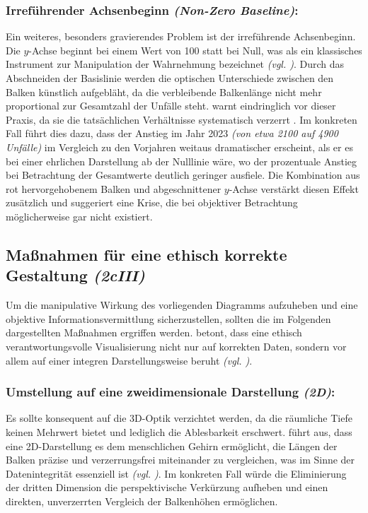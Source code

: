 \subsubsection{Irreführender Achsenbeginn \textit{(Non-Zero Baseline)}:}
Ein weiteres, besonders gravierendes Problem ist der irreführende Achsenbeginn. Die \(y\)-Achse beginnt bei einem Wert von 100 statt bei Null, was \citeauthor{1} als ein klassisches Instrument zur Manipulation der Wahrnehmung bezeichnet \textit{(\acs{vgl.} \cite[50]{1})}. Durch das Abschneiden der Basislinie werden die optischen Unterschiede zwischen den Balken künstlich aufgebläht, da die verbleibende Balkenlänge nicht mehr proportional zur Gesamtzahl der Unfälle steht. \citeauthor{2} warnt eindringlich vor dieser Praxis, da sie die tatsächlichen Verhältnisse systematisch verzerrt \cite[31, 55]{2}. Im konkreten Fall führt dies dazu, dass der Anstieg im Jahr 2023 \textit{(von etwa 2100 auf 4900 Unfälle)} im Vergleich zu den Vorjahren weitaus dramatischer erscheint, als er es bei einer ehrlichen Darstellung ab der Nulllinie wäre, wo der prozentuale Anstieg bei Betrachtung der Gesamtwerte deutlich geringer ausfiele. Die Kombination aus rot hervorgehobenem Balken und abgeschnittener \(y\)-Achse verstärkt diesen Effekt zusätzlich und suggeriert eine Krise, die bei objektiver Betrachtung möglicherweise gar nicht existiert.


\subsection{Maßnahmen für eine ethisch korrekte Gestaltung \textit{(2cIII)}}

Um die manipulative Wirkung des vorliegenden Diagramms aufzuheben und eine objektive Informationsvermittlung sicherzustellen, sollten die im Folgenden dargestellten Maßnahmen ergriffen werden. \citeauthor{2} betont, dass eine ethisch verantwortungsvolle Visualisierung nicht nur auf korrekten Daten, sondern vor allem auf einer integren Darstellungsweise beruht \textit{(\acs{vgl.} \cite[54]{2})}.

\subsubsection{Umstellung auf eine zweidimensionale Darstellung \textit{(2D)}:}
Es sollte konsequent auf die 3D-Optik verzichtet werden, da die räumliche Tiefe keinen Mehrwert bietet und lediglich die Ablesbarkeit erschwert. \citeauthor{2} führt aus, dass eine 2D-Darstellung es dem menschlichen Gehirn ermöglicht, die Längen der Balken präzise und verzerrungsfrei miteinander zu vergleichen, was im Sinne der Datenintegrität essenziell ist \textit{(\acs{vgl.} \cite[27, 54]{2})}. Im konkreten Fall würde die Eliminierung der dritten Dimension die perspektivische Verkürzung aufheben und einen direkten, unverzerrten Vergleich der Balkenhöhen ermöglichen.

